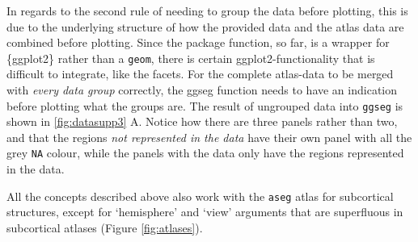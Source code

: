 \documentclass[fleqn,10pt]{wlpeerj} %
\begin{document}
In regards to the second rule of needing to group the data before plotting, this is due to the underlying structure of how the provided data and the atlas data are combined before plotting.
Since the package function, so far, is a wrapper for \{ggplot2\} rather than a \texttt{geom}, there is certain ggplot2-functionality that is difficult to integrate, like the facets.
For the complete atlas-data to be merged with \emph{every data group} correctly, the ggseg function needs to have an indication before plotting what the groups are.
The result of ungrouped data into \texttt{ggseg} is shown in \ref{fig:datasupp3} A.
Notice how there are three panels rather than two, and that the regions \emph{not represented in the data} have their own panel with all the grey \texttt{NA} colour, while the panels with the data only have the regions represented in the data.

All the concepts described above also work with the \texttt{aseg} atlas for subcortical structures, except for `hemisphere' and `view' arguments that are superfluous in subcortical atlases (Figure \ref{fig:atlases}).
\end{document}

